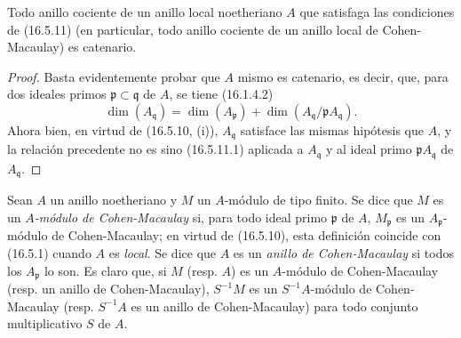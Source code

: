 \begin{corollary}[16.5.12]
\label{0.16.5.12-fr}
Todo anillo cociente de un anillo local noetheriano $A$ que satisfaga las
condiciones de \textup{(16.5.11)} (en particular, todo anillo cociente de un anillo local
de Cohen-Macaulay) es catenario.
\end{corollary}

\begin{proof}
Basta evidentemente probar que $A$ mismo es catenario, es decir, que,
para dos ideales primos $\mathfrak{p}\subset\mathfrak{q}$ de $A$, se tiene
(16.1.4.2)
\[
  \dim(A_{\mathfrak{q}})
  =\dim(A_{\mathfrak{p}})
  +\dim(A_{\mathfrak{q}}/\mathfrak{p}A_{\mathfrak{q}}).
\]
Ahora bien, en virtud de (16.5.10, (i)), $A_{\mathfrak{q}}$ satisface las mismas
hipótesis que $A$, y la relación precedente no es sino
(16.5.11.1) aplicada a $A_{\mathfrak{q}}$ y al ideal primo
$\mathfrak{p}A_{\mathfrak{q}}$ de $A_{\mathfrak{q}}$.
\end{proof}

\begin{env}[16.5.13]
\label{0.16.5.13-fr}
Sean $A$ un anillo noetheriano y $M$ un $A$-módulo de tipo finito. Se dice que
$M$ es un \emph{$A$-módulo de Cohen-Macaulay} si, para todo ideal primo
$\mathfrak{p}$ de $A$, $M_{\mathfrak{p}}$ es un $A_{\mathfrak{p}}$-módulo
de Cohen-Macaulay; en virtud de (16.5.10), esta definición coincide con
(16.5.1) cuando $A$ es \emph{local}. Se dice que $A$ es un
\emph{anillo de Cohen-Macaulay} si todos los $A_{\mathfrak{p}}$ lo son. Es
claro que, si $M$ (resp. $A$) es un $A$-módulo de Cohen-Macaulay (resp. un
anillo de Cohen-Macaulay), $S^{-1}M$ es un $S^{-1}A$-módulo de Cohen-Macaulay
(resp. $S^{-1}A$ es un anillo de Cohen-Macaulay) para todo conjunto
multiplicativo $S$ de $A$.
\end{env}
